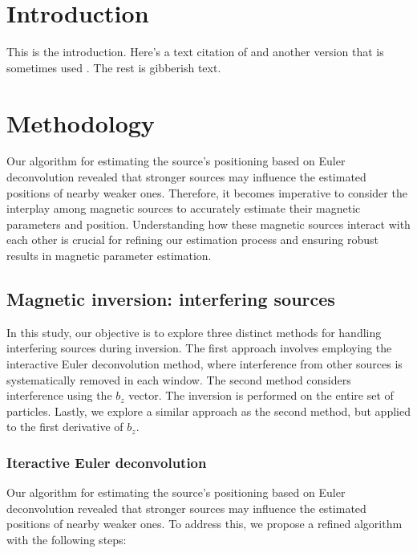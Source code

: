 \section{Introduction}

This is the introduction. Here's a text citation of \citet{OliveiraJr2015}
and another version that is sometimes used \citep{OliveiraJr2015}.
The rest is gibberish text.




\section{Methodology}

Our algorithm for estimating the source's positioning based on Euler deconvolution revealed that stronger sources may influence the estimated positions of nearby weaker ones. Therefore, it becomes imperative to consider the interplay among magnetic sources to accurately estimate their magnetic parameters and position. Understanding how these magnetic sources interact with each other is crucial for refining our estimation process and ensuring robust results in magnetic parameter estimation.


\subsection{Magnetic inversion: interfering sources}
    
In this study, our objective is to explore three distinct methods for handling interfering sources during inversion. The first approach involves employing the interactive Euler deconvolution method, where interference from other sources is systematically removed in each window. The second method considers interference using the $b_z$ vector. The inversion is performed on the entire set of particles. Lastly, we explore a similar approach as the second method, but applied to the first derivative of $b_z$.


\subsubsection{Iteractive Euler deconvolution}

Our algorithm for estimating the source's positioning based on Euler deconvolution revealed that stronger sources may influence the estimated positions of nearby weaker ones. To address this, we propose a refined algorithm with the following steps:

